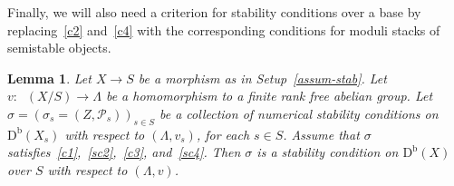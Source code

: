 \documentclass[11pt, reqno]{amsart}
\numberwithin{equation}{section}
\theoremstyle{plain}
\newtheorem{lemma}[theorem]{Lemma}
\theoremstyle{remark}
\theoremstyle{definition}
\theoremstyle{italicsname}
\newcommand{\Db}{\mathrm{D^b}}
\newcommand{\num}{\mathrm{num}}
\DeclareMathOperator{\Knum}{\rK_{\num}}
\newcommand{\cP}{\mathscr{P}}
\newcommand{\rK}{\mathrm{K}}
\begin{document}
Finally, we will also need a criterion for stability conditions over a base by replacing~\ref{c2} and~\ref{c4} with the corresponding conditions for moduli stacks of semistable objects.

\begin{lemma}\label{lem:open-geo-stab}
Let $X\to S$ be a morphism as in Setup~\ref{assum-stab}. 
Let $v\colon\Knum(X/S)\to\Lambda$ be a homomorphism to a finite rank free abelian group. 
Let ${\sigma}=(\sigma_s=(Z,\cP_s))_{s\in S}$ be a collection of numerical stability conditions on $\Db(X_s)$ with respect to $(\Lambda,v_s)$, for each $s\in S$. 
Assume that ${\sigma}$ satisfies~\ref{c1},~\ref{sc2},~\ref{c3}, and~\ref{sc4}.
Then ${\sigma}$ is a stability condition on $\Db(X)$ over $S$ with respect to $(\Lambda,v)$.
\end{lemma}
\end{document}
